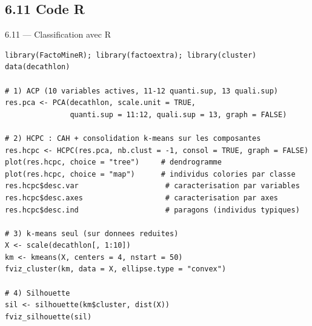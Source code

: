 \subsection{6.11 Code R}
\begin{frame}[fragile]{6.11 — Classification avec R}
\begin{lstlisting}
library(FactoMineR); library(factoextra); library(cluster)
data(decathlon)

# 1) ACP (10 variables actives, 11-12 quanti.sup, 13 quali.sup)
res.pca <- PCA(decathlon, scale.unit = TRUE,
               quanti.sup = 11:12, quali.sup = 13, graph = FALSE)

# 2) HCPC : CAH + consolidation k-means sur les composantes
res.hcpc <- HCPC(res.pca, nb.clust = -1, consol = TRUE, graph = FALSE)
plot(res.hcpc, choice = "tree")     # dendrogramme
plot(res.hcpc, choice = "map")      # individus colories par classe
res.hcpc$desc.var                    # caracterisation par variables
res.hcpc$desc.axes                   # caracterisation par axes
res.hcpc$desc.ind                    # paragons (individus typiques)

# 3) k-means seul (sur donnees reduites)
X <- scale(decathlon[, 1:10])
km <- kmeans(X, centers = 4, nstart = 50)
fviz_cluster(km, data = X, ellipse.type = "convex")

# 4) Silhouette
sil <- silhouette(km$cluster, dist(X))
fviz_silhouette(sil)
\end{lstlisting}
\end{frame}


